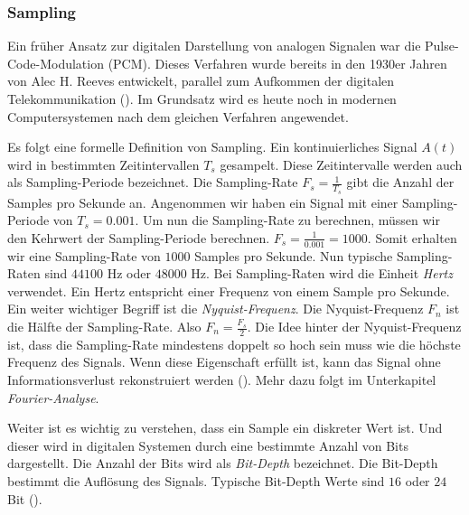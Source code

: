 \documentclass[11pt,a4paper]{article}
\begin{document}
\subsubsection{Sampling}
Ein früher Ansatz zur digitalen Darstellung von analogen Signalen war die Pulse-Code-Modulation
(PCM). Dieses Verfahren wurde bereits in den 1930er Jahren von Alec H. Reeves entwickelt,
parallel zum Aufkommen der digitalen Telekommunikation (\cite[p.~57]{deloraine1965pcm}).
Im Grundsatz wird es heute noch in modernen Computersystemen nach dem gleichen Verfahren angewendet.

\noindent \newline
Es folgt eine formelle Definition von Sampling. Ein kontinuierliches Signal \(A(t)\)
wird in bestimmten Zeitintervallen \(T_s\) gesampelt. Diese Zeitintervalle werden auch als
Sampling-Periode bezeichnet. Die Sampling-Rate \(F_s = \displaystyle\frac{1}{T_s}\) gibt die Anzahl
der Samples pro Sekunde an. Angenommen wir haben ein Signal mit einer Sampling-Periode
von \(T_s = 0.001\). Um nun die Sampling-Rate zu berechnen, müssen wir den Kehrwert der
Sampling-Periode berechnen. \(F_s = \displaystyle\frac{1}{0.001} = 1000\). Somit erhalten wir eine
Sampling-Rate von \(1000\) Samples pro Sekunde. Nun typische Sampling-Raten sind \(44100\) Hz
oder \(48000\) Hz. Bei Sampling-Raten wird die Einheit \textit{Hertz} verwendet. Ein Hertz entspricht
einer Frequenz von einem Sample pro Sekunde. Ein weiter wichtiger Begriff ist die
\textit{Nyquist-Frequenz}. Die Nyquist-Frequenz \(F_n\) ist die Hälfte der Sampling-Rate.
Also \(F_n = \displaystyle\frac{F_s}{2}\). Die Idee hinter der Nyquist-Frequenz ist, dass die
Sampling-Rate mindestens doppelt so hoch sein muss wie die höchste Frequenz des Signals. Wenn diese
Eigenschaft erfüllt ist, kann das Signal ohne Informationsverlust rekonstruiert werden
(\cite[Chapter~3.1]{tarr2018hackaudio}). Mehr dazu folgt im Unterkapitel
\textit{Fourier-Analyse}.

\noindent \newline
Weiter ist es wichtig zu verstehen, dass ein Sample ein diskreter Wert ist. Und dieser wird in
digitalen Systemen durch eine bestimmte Anzahl von Bits dargestellt. Die Anzahl der Bits wird
als \textit{Bit-Depth} bezeichnet. Die Bit-Depth bestimmt die Auflösung des Signals. Typische
Bit-Depth Werte sind \(16\) oder \(24\) Bit (\cite[p.10]{somberg2019audioapi}).
\end{document}
